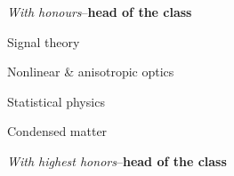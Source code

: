 \documentclass[9pt,a4paper,academicons]{altacv}
\begin{document}
\divider

\textit{With honours}--\textbf{head of the class}
\begin{cvlistdescription}
    \item Signal theory
    \item Nonlinear \& anisotropic optics
    \item Statistical physics
    \item Condensed matter
\end{cvlistdescription}
\divider

\textit{With highest honors}--\textbf{head of the class}






\end{document}
